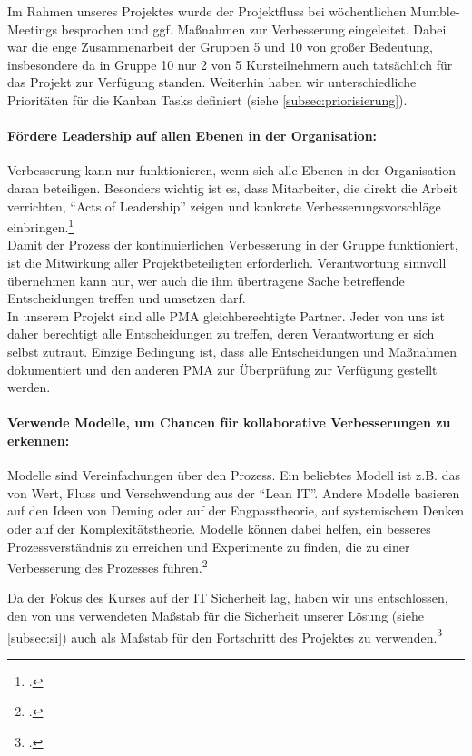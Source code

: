Im Rahmen unseres Projektes wurde der Projektfluss bei wöchentlichen
Mumble-Meetings besprochen und ggf. Maßnahmen zur Verbesserung eingeleitet.
Dabei war die enge Zusammenarbeit der Gruppen 5 und 10 von großer Bedeutung,
insbesondere da in Gruppe 10 nur 2 von 5 Kursteilnehmern auch tatsächlich für
das Projekt zur Verfügung standen. Weiterhin haben wir unterschiedliche
Prioritäten für die Kanban Tasks definiert (siehe
\ref{subsec:priorisierung}).\\

\paragraph{Fördere Leadership auf allen Ebenen in der Organisation:}
Verbesserung kann nur funktionieren, wenn sich alle Ebenen in der Organisation
daran beteiligen. Besonders wichtig ist es, dass Mitarbeiter, die direkt die
Arbeit verrichten, ``Acts of Leadership'' zeigen und konkrete
Verbesserungsvorschläge einbringen.\footcite{wikiKanban}\\

Damit der Prozess der kontinuierlichen Verbesserung in der Gruppe funktioniert,
ist die Mitwirkung aller Projektbeteiligten erforderlich. Verantwortung
sinnvoll übernehmen kann nur, wer auch die ihm übertragene Sache betreffende
Entscheidungen treffen und umsetzen darf.\\

In unserem Projekt sind alle PMA gleichberechtigte Partner. Jeder von uns ist
daher berechtigt alle Entscheidungen zu treffen, deren Verantwortung er sich
selbst zutraut. Einzige Bedingung ist, dass alle Entscheidungen und Maßnahmen
dokumentiert und den anderen PMA zur Überprüfung zur Verfügung gestellt werden.

\paragraph{Verwende Modelle, um Chancen für kollaborative Verbesserungen zu erkennen:}
Modelle sind Vereinfachungen über den Prozess. Ein beliebtes Modell ist z.B.
das von Wert, Fluss und Verschwendung aus der ``Lean IT''. Andere Modelle
basieren auf den Ideen von Deming oder auf der Engpasstheorie, auf systemischem
Denken oder auf der Komplexitätstheorie. Modelle können dabei helfen, ein
besseres Prozessverständnis zu erreichen und Experimente zu finden, die zu
einer Verbesserung des Prozesses führen.\footcite{wikiKanban}

Da der Fokus des Kurses auf der IT Sicherheit lag, haben wir uns entschlossen,
den von uns verwendeten Maßstab für die Sicherheit unserer Lösung (siehe
\ref{subsec:si}) auch als Maßstab für den Fortschritt des Projektes zu
verwenden.\footcite{wikiKanban} \\

